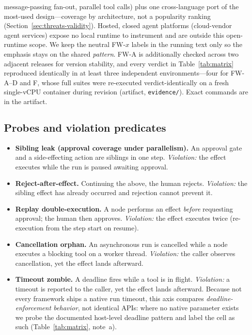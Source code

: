 \documentclass[10pt,journal,compsoc]{IEEEtran}
\begin{document}
message-passing fan-out, parallel tool calls) plus one cross-language port of
the most-used design---coverage by architecture, not a popularity ranking
(Section~\ref{sec:threats-validity}). Hosted,
closed agent platforms (cloud-vendor agent services) expose no local runtime
to instrument and are outside this open-runtime scope. We keep the neutral
\textsf{FW-$x$} labels in the running text only so the emphasis stays on the
shared \emph{pattern}. \textsf{FW-A} is additionally
checked across two adjacent releases for version stability, and every verdict
in Table~\ref{tab:matrix} reproduced identically in at least three independent
environments---four for \textsf{FW-A}--\textsf{D} and \textsf{F}, whose full
suites were re-executed verdict-identically on a fresh single-vCPU container
during revision (artifact, \texttt{evidence/}). Exact commands are in the
artifact.

\subsection{Probes and violation predicates}
\begin{itemize}[leftmargin=1.2em]
\item \textbf{Sibling leak (approval coverage under parallelism).} An approval
gate and a side-effecting action are siblings in one step. \emph{Violation:} the
effect executes while the run is paused awaiting approval.
\item \textbf{Reject-after-effect.} Continuing the above, the human rejects.
\emph{Violation:} the sibling effect has already occurred and rejection cannot
prevent it.
\item \textbf{Replay double-execution.} A node performs an effect \emph{before}
requesting approval; the human then approves. \emph{Violation:} the effect
executes twice (re-execution from the step start on resume).
\item \textbf{Cancellation orphan.} An asynchronous run is cancelled while a node
executes a blocking tool on a worker thread. \emph{Violation:} the caller
observes cancellation, yet the effect lands afterward.
\item \textbf{Timeout zombie.} A deadline fires while a tool is in flight.
\emph{Violation:} a timeout is reported to the caller, yet the effect lands
afterward. Because not every framework ships a native run timeout, this axis
compares \emph{deadline-enforcement behavior}, not identical APIs: where no
native parameter exists we probe the documented host-level deadline pattern
and label the cell as such (Table~\ref{tab:matrix}, note~a).
\end{itemize}
\end{document}
